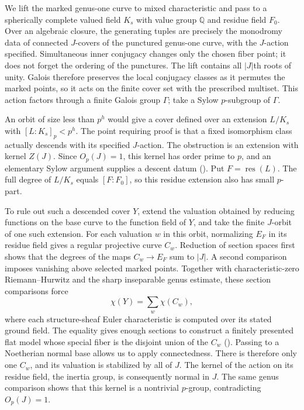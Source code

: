 We lift the marked genus-one curve to mixed characteristic and pass to a
spherically complete valued field $K_s$ with value group $\mathbb Q$
and residue field $F_0$. Over an algebraic closure, the generating
tuples are precisely the monodromy data of connected $J$-covers of the
punctured genus-one curve, with the $J$-action specified. Simultaneous
inner conjugacy changes only the chosen fiber point; it does not forget
the ordering of the punctures. The lift contains all $|J|$th roots of
unity. Galois therefore preserves the local conjugacy classes as it
permutes the marked points, so it acts on the finite cover set with
the prescribed multiset. This action factors through a finite Galois
group $\Gamma$; take a Sylow $p$-subgroup of $\Gamma$.

An orbit of size less than $p^h$ would give a cover defined over an
extension $L/K_s$ with $[L:K_s]_p<p^h$. The point requiring proof is
that a fixed isomorphism class actually descends with its specified
$J$-action. The obstruction is an extension with kernel $Z(J)$.
Since $O_p(J)=1$, this kernel has order prime to $p$, and an elementary
Sylow argument supplies a descent datum
(). Put $F=\operatorname{res}(L)$.
The full degree of $L/K_s$ equals $[F:F_0]$, so this residue extension
also has small $p$-part.

To rule out such a descended cover $Y$, extend the valuation obtained
by reducing functions on the base curve to the function field of $Y$,
and take the finite $J$-orbit of one such extension. For each valuation
$w$ in this orbit, normalizing $E_F$ in its residue field gives a
regular projective curve $C_w$. Reduction of section spaces first shows
that the degrees of the maps $C_w\to E_F$ sum to $|J|$. A second
comparison imposes vanishing above selected marked points. Together
with characteristic-zero Riemann--Hurwitz and the sharp inseparable
genus estimate, these section comparisons
force
\[
                         \chi(Y)=\sum_w\chi(C_w),
\]
where each structure-sheaf Euler characteristic is computed over its
stated ground field. The equality gives enough sections to construct a
finitely presented flat model whose special fiber is the disjoint union
of the $C_w$ (). Passing to a
Noetherian normal base allows us to apply connectedness. There is
therefore only one $C_w$, and its valuation is stabilized by all of
$J$. The kernel of the action on its residue field, the inertia group,
is consequently normal in $J$. The same genus comparison shows that
this kernel is a nontrivial $p$-group, contradicting $O_p(J)=1$.

